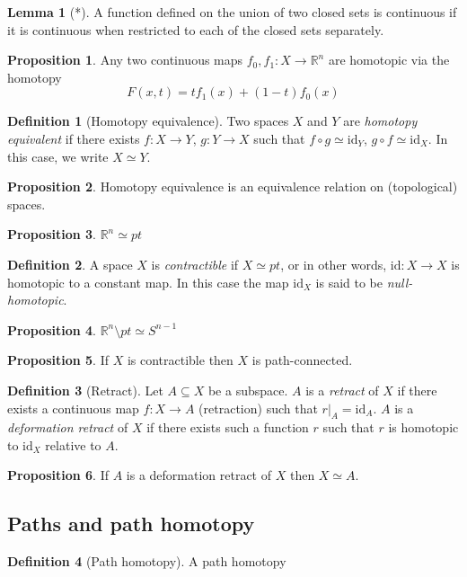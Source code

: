 \documentclass[a4paper,14pt]{extarticle}
\theoremstyle{definition}
\newtheorem*{definition}{Definition}
\newtheorem*{lemma}{Lemma}
\newtheorem*{proposition}{Proposition}
\begin{document}
\begin{lemma}[*]
  A function defined on the union of two closed sets is continuous if it is continuous when 
  restricted to each of the closed sets separately.
\end{lemma}

\begin{proposition}
  Any two continuous maps $f_0,f_1:X\rightarrow \mathbb{R}^n$ are homotopic via the homotopy
  \[F(x,t)=tf_1(x)+(1-t)f_0(x)\]
\end{proposition}

\begin{definition}[Homotopy equivalence]
  Two spaces $X$ and $Y$ are \emph{homotopy equivalent} if there exists 
  $f:X\rightarrow Y$, $g:Y\rightarrow X$ such that 
  $f\circ g\simeq\text{id}_Y$, $g\circ f\simeq\text{id}_X$. In this case, we write 
  $X\simeq Y$.
\end{definition}

\begin{proposition}
  Homotopy equivalence is an equivalence relation on (topological) spaces.
\end{proposition}

\begin{proposition}
  $\mathbb{R}^n\simeq pt$
\end{proposition}

\begin{definition}
  A space $X$ is \emph{contractible} if $X\simeq pt$, or in other words,
  $\text{id}:X\rightarrow X$ is homotopic to 
  a constant map. In this case the map $\text{id}_X$ is said to be \emph{null-homotopic}.
\end{definition}

\begin{proposition}
  $\mathbb{R}^n\setminus pt\simeq S^{n-1}$
\end{proposition}

\begin{proposition}
  If $X$ is contractible then $X$ is path-connected.
\end{proposition}

\begin{definition}[Retract]
  Let $A\subseteq X$ be a subspace. $A$ is a \emph{retract} of $X$ if there exists a continuous map $f:X\rightarrow A$ (retraction) such that $r|_A=\text{id}_A$. $A$ is a \emph{deformation
  retract} of $X$ if there exists such a function $r$ such that $r$ is homotopic to 
  $\text{id}_X$ relative to $A$.
\end{definition}

\begin{proposition}
  If $A$ is a deformation retract of $X$ then $X\simeq A$.
\end{proposition}

\subsection{Paths and path homotopy}

\begin{definition}[Path homotopy]
  A path homotopy
\end{definition}
\end{document}
